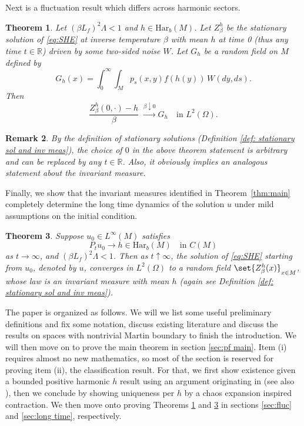 \documentclass{article}
\newtheorem{theorem}{Theorem}
\newtheorem{remark}[theorem]{Remark}
\numberwithin{theorem}{section}
\def\text{\mbox}
\def\RR{\mathbb{R}} %
\begin{document}
Next is a fluctuation result which differs across harmonic sectors.
\begin{theorem}\label{thm:fluc}
Let $(\beta L_f)^2\Lambda<1$ and $h\in\mathrm{Har}_b(M)$. Let $Z_\beta^h$ be the stationary solution of \eqref{eq:SHE} at inverse temperature $\beta$ with mean $h$ at time 0 (thus any time $t\in \RR$) driven by some two-sided noise $W$. Let $G_h$ be a random field on $M$ defined by
\[
G_h(x)=\int_0^\infty\int_M p_{s}(x,y)f(h(y))\,W(dy,ds).
\]
Then
\[
\frac{Z_\beta^h(0,\cdot)-h}{\beta}\;\stackrel{\beta\downarrow0}{\longrightarrow}G_h
\quad\text{in }L^2(\Omega).
\]
\end{theorem}
\begin{remark}
    By the definition of stationary solutions (Definition \ref{def: stationary sol and inv meas}), the choice of $0$ in the above theorem statement is arbitrary and can be replaced by any $t\in \RR$. Also, it obviously implies an analogous statement about the invariant measure.
\end{remark}
Finally, we show that the invariant measures identified in Theorem~\ref{thm:main} completely determine the long time dynamics of the solution $u$ under mild assumptions on the initial condition.
\begin{theorem}\label{thm:IC determine long time}
Suppose $u_0\in L^\infty(M)$ satisfies
\[
P_tu_0 \to h\in \mathrm{Har}_b(M)
\quad\text{in }C(M)
\]
as $t\to\infty$, and $(\beta L_f)^2\Lambda<1$. Then as $t\uparrow\infty$, the solution of \eqref{eq:SHE} starting from $u_0$, denoted by $u$, converges in $L^2(\Omega)$ to a random field $\set{Z_\beta^h(x)}_{x\in M}$, whose law is an invariant measure with mean $h$ (again see Definition \ref{def: stationary sol and inv meas}).
\end{theorem}

The paper is organized as follows. We will we list some useful preliminary definitions and fix some notation, discuss existing literature and discuss the results on spaces with nontrivial Martin boundary to finish the introduction. We will then move on to prove the main theorem in section \ref{sec:pf main}. Item (i) requires almost no new mathematics, so most of the section is reserved for proving item (ii), the classification result. For that, we first show existence given a bounded positive harmonic $h$ result using an argument originating in \cite{GL20} (see also \cite{GHL25,COTX25}), then we conclude by showing uniqueness per $h$ by a chaos expansion inspired contraction. We then move onto proving Theorems \ref{thm:fluc} and \ref{thm:IC determine long time} in sections \ref{sec:fluc} and \ref{sec:long time}, respectively.
\end{document}
